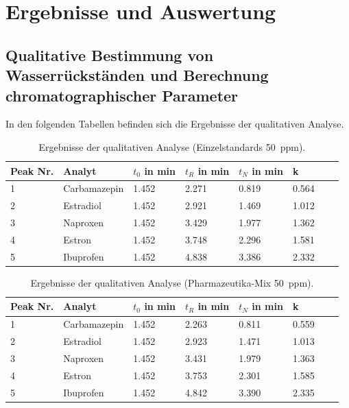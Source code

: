 \section{Ergebnisse und Auswertung}
  
  \subsection{Qualitative Bestimmung von Wasserrückständen und Berechnung chromatographischer Parameter} 
    
    In den folgenden Tabellen befinden sich die Ergebnisse der qualitativen Analyse. 
    
    \begin{table}[H]
      \centering
      \caption[Ergebnisse der qualitativen Analyse (Einzelstandards), Quelle: Autor]{Ergebnisse der qualitativen Analyse (Einzelstandards \SI[mode=text]{50}{ppm}).}
      
      \label{tab:ErgebnisseEinzelstandards}
      \begin{tabular}{@{}l|lllllp{4.5cm}l@{}}
        \toprule
          Peak Nr. & Analyt & $t_0$ in \si{\minute} & $t_R$ in \si{\minute} & $t_N$ in \si{\minute}  & k \\ \midrule
          1 & Carbamazepin & 1.452 & 2.271 & 0.819 & 0.564 \\
          2 & Estradiol & 1.452 & 2.921 & 1.469 & 1.012 \\
          3 & Naproxen & 1.452 & 3.429 & 1.977 & 1.362 \\
          4 & Estron & 1.452 & 3.748 & 2.296 & 1.581 \\
          5 & Ibuprofen & 1.452 & 4.838 & 3.386 & 2.332 \\ \bottomrule
      \end{tabular}
    \end{table}  
    
    \begin{table}[H]
      \centering
      \caption[Ergebnisse der qualitativen Analyse (Pharmazeutika-Mix), Quelle: Autor]{Ergebnisse der qualitativen Analyse (Pharmazeutika-Mix \SI[mode=text]{50}{ppm}).}
      
      \label{tab:ErgebnissePharmamix}
      \begin{tabular}{@{}l|lllllp{4.5cm}l@{}}
        \toprule
          Peak Nr. & Analyt & $t_0$ in \si{\minute} & $t_R$ in \si{\minute} & $t_N$ in \si{\minute}  & k \\ \midrule
          1 & Carbamazepin & 1.452 & 2.263 & 0.811 & 0.559 \\
          2 & Estradiol & 1.452 & 2.923 & 1.471 & 1.013 \\
          3 & Naproxen & 1.452 & 3.431 & 1.979 & 1.363 \\
          4 & Estron & 1.452 & 3.753 & 2.301 & 1.585 \\
          5 & Ibuprofen & 1.452 & 4.842 & 3.390 & 2.335 \\ \bottomrule
      \end{tabular}
    \end{table}  
    
